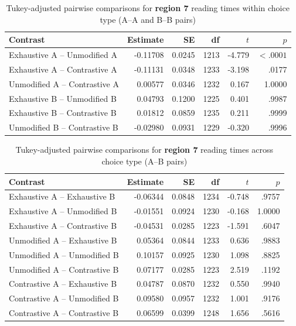 \documentclass[ruler]{CUP-JNL-LIN}%
\begin{document}
\begin{table}[htbp]
\centering
\caption{Tukey-adjusted pairwise comparisons for \textbf{region 7} reading times within choice type (A--A and B--B pairs)}
\label{tab:r7-pairwise-within-choice}
\begin{tabularx}{\textwidth}{@{}Xrrrrr@{}}
\toprule
Contrast & Estimate & SE & df & $t$ & $p$ \\
\midrule
Exhaustive A -- Unmodified A   & -0.11708 & 0.0245 & 1213 & -4.779 & $< .0001$ \\
Exhaustive A -- Contrastive A  & -0.11131 & 0.0348 & 1233 & -3.198 & .0177 \\
Unmodified A -- Contrastive A  &  0.00577 & 0.0346 & 1232 &  0.167 & 1.0000 \\
Exhaustive B -- Unmodified B   &  0.04793 & 0.1200 & 1225 &  0.401 & .9987 \\
Exhaustive B -- Contrastive B  &  0.01812 & 0.0859 & 1235 &  0.211 & .9999 \\
Unmodified B -- Contrastive B  & -0.02980 & 0.0931 & 1229 & -0.320 & .9996 \\
\bottomrule
\end{tabularx}
\end{table}

\begin{table}[htbp]
\centering
\caption{Tukey-adjusted pairwise comparisons for \textbf{region 7} reading times across choice type (A--B pairs)}
\label{tab:r7-pairwise-across-choice}
\begin{tabularx}{\textwidth}{@{}Xrrrrr@{}}
\toprule
Contrast & Estimate & SE & df & $t$ & $p$ \\
\midrule
Exhaustive A -- Exhaustive B   & -0.06344 & 0.0848 & 1234 & -0.748 & .9757 \\
Exhaustive A -- Unmodified B   & -0.01551 & 0.0924 & 1230 & -0.168 & 1.0000 \\
Exhaustive A -- Contrastive B  & -0.04531 & 0.0285 & 1223 & -1.591 & .6047 \\
Unmodified A -- Exhaustive B   &  0.05364 & 0.0844 & 1233 &  0.636 & .9883 \\
Unmodified A -- Unmodified B   &  0.10157 & 0.0925 & 1230 &  1.098 & .8825 \\
Unmodified A -- Contrastive B  &  0.07177 & 0.0285 & 1223 &  2.519 & .1192 \\
Contrastive A -- Exhaustive B  &  0.04787 & 0.0870 & 1232 &  0.550 & .9940 \\
Contrastive A -- Unmodified B  &  0.09580 & 0.0957 & 1232 &  1.001 & .9176 \\
Contrastive A -- Contrastive B &  0.06599 & 0.0399 & 1248 &  1.656 & .5616 \\
\bottomrule
\end{tabularx}
\end{table}
\end{document}
